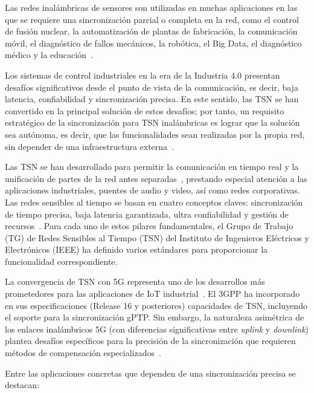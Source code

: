 Las redes inalámbricas de sensores son utilizadas en muchas aplicaciones en las que se requiere una sincronización parcial o completa en la red, como el control de fusión nuclear, la automatización de plantas de fabricación, la comunicación móvil, el diagnóstico de fallos mecánicos, la robótica, el Big Data, el diagnóstico médico y la educación~\cite{balakrishnan2023,lasassmeh2010,masalskyi2024}.

Los sistemas de control industriales en la era de la Industria 4.0 presentan desafíos significativos desde el punto de vista de la comunicación, es decir, baja latencia, confiabilidad y sincronización precisa. En este sentido, las TSN se han convertido en la principal solución de estos desafíos; por tanto, un requisito estratégico de la sincronización para TSN inalámbricas es lograr que la solución sea autónoma, es decir, que las funcionalidades sean realizadas por la propia red, sin depender de una infraestructura externa~\cite{seijo2022}.

Las TSN se han desarrollado para permitir la comunicación en tiempo real y la unificación de partes de la red antes separadas~\cite{krummacker2020}, prestando especial atención a las aplicaciones industriales, puentes de audio y video, así como redes corporativas. Las redes sensibles al tiempo se basan en cuatro conceptos claves: sincronización de tiempo precisa, baja latencia garantizada, ultra confiabilidad y gestión de recursos~\cite{mildner2019}. Para cada uno de estos pilares fundamentales, el Grupo de Trabajo (TG) de Redes Sensibles al Tiempo (TSN) del Instituto de Ingenieros Eléctricos y Electrónicos (IEEE) ha definido varios estándares para proporcionar la funcionalidad correspondiente.

La convergencia de TSN con 5G representa uno de los desarrollos más prometedores para las aplicaciones de IoT industrial~\cite{adil2025}. El 3GPP ha incorporado en sus especificaciones (Release 16 y posteriores) capacidades de TSN, incluyendo el soporte para la sincronización gPTP. Sin embargo, la naturaleza asimétrica de los enlaces inalámbricos 5G (con diferencias significativas entre \textit{uplink} y \textit{downlink}) plantea desafíos específicos para la precisión de la sincronización que requieren métodos de compensación especializados~\cite{muslim2025}.

Entre las aplicaciones concretas que dependen de una sincronización precisa se destacan:

